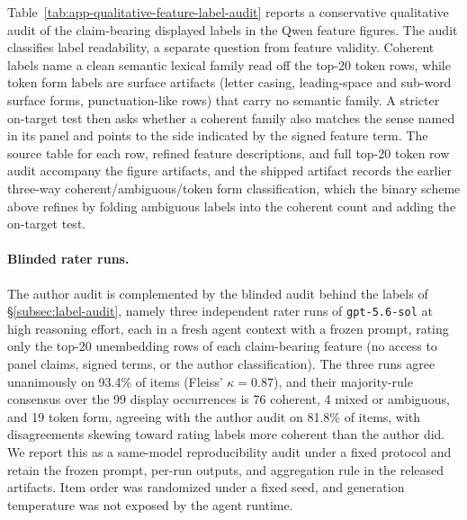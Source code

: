 Table~\ref{tab:app-qualitative-feature-label-audit} reports a conservative
qualitative audit of the claim-bearing displayed labels in the Qwen feature
figures. The audit classifies label readability, a separate question from
feature validity. Coherent labels name a clean semantic lexical family read off the top-20
token rows, while token form labels are surface artifacts (letter casing,
leading-space and sub-word surface forms, punctuation-like rows) that carry
no semantic family. A stricter on-target test then asks whether a coherent
family also matches the sense named in its panel and points to the side
indicated by the signed feature term.
The source table for each row, refined feature descriptions, and full top-20
token row audit accompany the figure artifacts, and the shipped artifact records
the earlier three-way coherent/ambiguous/token form classification, which
the binary scheme above refines by folding ambiguous labels into the
coherent count and adding the on-target test.

\paragraph{Blinded rater runs.}
The author audit is complemented by the blinded audit behind the
labels of \S\ref{subsec:label-audit}, namely three independent rater runs of
\texttt{gpt-5.6-sol} at high reasoning effort, each in a fresh agent
context with a frozen prompt, rating only
the top-20 unembedding rows of each claim-bearing feature (no access to
panel claims, signed terms, or the author classification). The three runs
agree unanimously on 93.4\% of items (Fleiss' \(\kappa=0.87\)), and their
majority-rule consensus over the 99 display occurrences is 76 coherent, 4
mixed or ambiguous, and 19 token form, agreeing with the author audit on
81.8\% of items, with disagreements skewing toward rating labels
more coherent than the author did. We report this as a
same-model reproducibility audit under a fixed protocol and retain the frozen
prompt, per-run outputs, and aggregation rule in the released artifacts.
Item order was randomized under a fixed seed, and generation temperature
was not exposed by the agent runtime.

